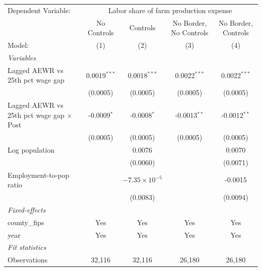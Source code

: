 
\begingroup
\centering
\begin{tabular}{lcccc}
   \tabularnewline \midrule \midrule
   Dependent Variable: & \multicolumn{4}{c}{Labor share of farm production expense}\\
                                                   & No Controls    & Controls               & No Border, No Controls & No Border, Controls \\   
   Model:                                          & (1)            & (2)                    & (3)                    & (4)\\  
   \midrule
   \emph{Variables}\\
   Lagged AEWR vs 25th pct wage gap                & 0.0019$^{***}$ & 0.0018$^{***}$         & 0.0022$^{***}$         & 0.0022$^{***}$\\   
                                                   & (0.0005)       & (0.0005)               & (0.0005)               & (0.0005)\\   
   Lagged AEWR vs 25th pct wage gap $\times$ Post  & -0.0009$^{*}$  & -0.0008$^{*}$          & -0.0013$^{**}$         & -0.0012$^{**}$\\   
                                                   & (0.0005)       & (0.0005)               & (0.0005)               & (0.0005)\\   
   Log population                                  &                & 0.0076                 &                        & 0.0070\\   
                                                   &                & (0.0060)               &                        & (0.0071)\\   
   Employment-to-pop ratio                         &                & $-7.35\times 10^{-5}$  &                        & -0.0015\\   
                                                   &                & (0.0083)               &                        & (0.0094)\\   
   \midrule
   \emph{Fixed-effects}\\
   county\_fips                                    & Yes            & Yes                    & Yes                    & Yes\\  
   year                                            & Yes            & Yes                    & Yes                    & Yes\\  
   \midrule
   \emph{Fit statistics}\\
   Observations                                    & 32,116         & 32,116                 & 26,180                 & 26,180\\  

\end{tabular}
